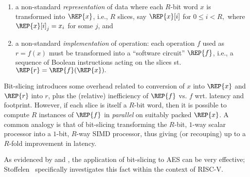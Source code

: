 \begin{enumerate}
\item a non-standard {\em representation}
      of data where
      each $R$-bit word $x$ is transformed into $\REP{x}$,
      i.e.,
      $R$ slices, say $\REP{x}[ i ]$ for
      $
      0 \leq i < R ,
      $
      where $\REP{x}[ i ]_j = x_i$ for some $j$,
      and
\item a non-standard {\em implementation}
      of operation:
      each operation $f$ used as
      $
          {r} =     {f}(     {x} )
      $
      must be transformed into a ``software circuit'' $\REP{f}$,
      i.e.,
      a sequence of Boolean instructions acting on the slices st.
      $
      \REP{r} = \REP{f}( \REP{x} ) .
      $
\end{enumerate}

\noindent
Bit-slicing introduces some overhead related to conversion of $x$ into
$\REP{x}$ and $\REP{r}$ into $r$, plus the (relative) inefficiency
of $\REP{f}$ vs. $f$ wrt. latency and footprint.
However, if each slice is itself a $R$-bit word, then it
is possible to compute $R$ instances of $\REP{f}$ in {\em parallel}
on suitably packed $\REP{x}$.
A common analogy is that of bit-slicing transforming the 
$R$-bit, $1$-way scalar processor 
into a 
$1$-bit, $R$-way SIMD   processor, 
thus giving (or recouping) up to a $R$-fold improvement in latency.

As evidenced by \cite{MatNak:07,Konighofer:08} and \cite{KasSch:09},
the application of bit-slicing to AES can be very effective;
Stoffelen~\cite[Section 3.1]{Stoffelen:19}
specifically investigates this fact within the context of RISC-V.

